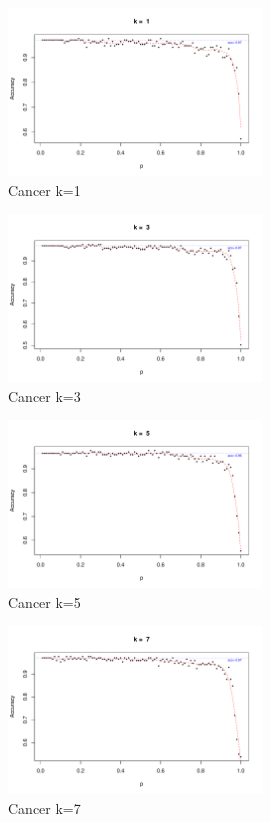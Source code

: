 \documentclass{article}
\begin{document}
\begin{figure}[h!]
 \centering
 \includegraphics[width=0.6\textwidth]{./figures/Cancer_k1.pdf}
 \caption{Cancer k=1}
 \label{fig:Cancer1}
\end{figure}
\begin{figure}[h!]
 \centering
 \includegraphics[width=0.6\textwidth]{./figures/Cancer_k3.pdf}
 \caption{Cancer k=3}
 \label{fig:Cancer3}
\end{figure}
\begin{figure}
 \centering
 \includegraphics[width=0.6\textwidth]{./figures/Cancer_k5.pdf}
 \caption{Cancer k=5}
 \label{fig:Cancer5}
\end{figure}
\begin{figure}
 \centering
 \includegraphics[width=0.6\textwidth]{./figures/Cancer_k7.pdf}
 \caption{Cancer k=7}
 \label{fig:Cancer7}
\end{figure}
\end{document}
